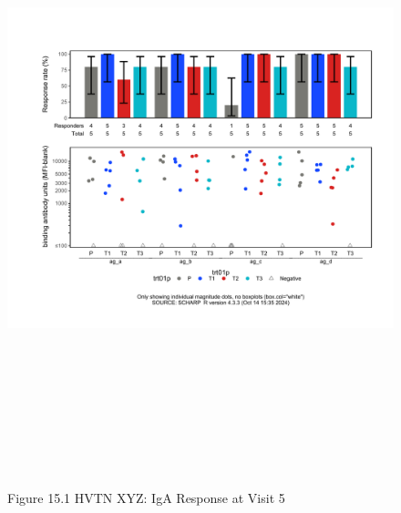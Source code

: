 \documentclass[12pt]{article}
\begin{document}
\begin{figure}[H]

{\centering \includegraphics[width=8.75in,height=7.25in]{test_cases_files/figure-latex/unnamed-chunk-30-1} 

}

\caption[Figure 15.1 boxplot (pos. response boxplots)]{Figure 15.1 HVTN XYZ: IgA Response at Visit 5}\label{fig:unnamed-chunk-30}
\end{figure}
\clearpage
\end{document}
